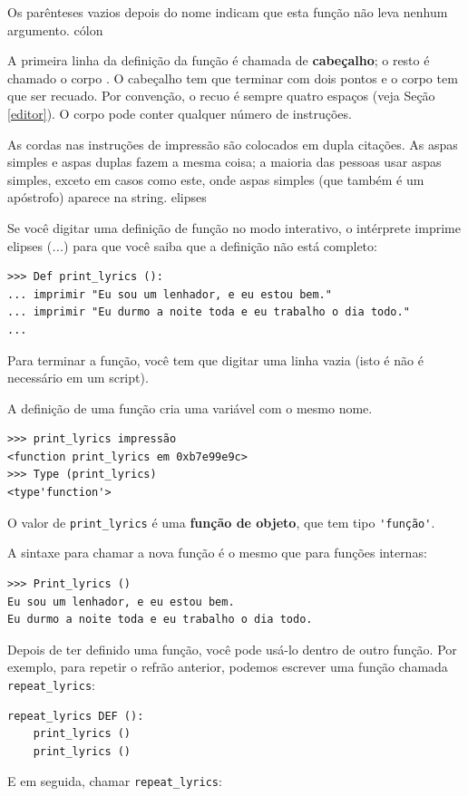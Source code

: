 \documentclass[10pt]{book}
\begin{document}
Os parênteses vazios depois do nome indicam que esta função
não leva nenhum argumento.
\index{} cólon

A primeira linha da definição da função é chamada de {\bf cabeçalho};
o resto é chamado o corpo {\bf}. O cabeçalho tem que terminar com dois pontos
e o corpo tem que ser recuado. Por convenção, o recuo é
sempre quatro espaços (veja Seção ~ \ref {editor}). O corpo pode conter
qualquer número de instruções.

As cordas nas instruções de impressão são colocados em dupla
citações. As aspas simples e aspas duplas fazem a mesma coisa;
a maioria das pessoas usar aspas simples, exceto em casos como este, onde
aspas simples (que também é um apóstrofo) aparece na string.
\index{} elipses

Se você digitar uma definição de função no modo interativo, o intérprete
imprime elipses ({\em ...}) para que você saiba que a definição
não está completo:

\begin{verbatim}
>>> Def print_lyrics ():
... imprimir "Eu sou um lenhador, e eu estou bem."
... imprimir "Eu durmo a noite toda e eu trabalho o dia todo."
...
\end{verbatim}
%
Para terminar a função, você tem que digitar uma linha vazia (isto é
não é necessário em um script).

A definição de uma função cria uma variável com o mesmo nome.

\begin{verbatim}
>>> print_lyrics impressão
<function print_lyrics em 0xb7e99e9c>
>>> Type (print_lyrics)
<type'function'>
\end{verbatim}
%
O valor de \verb "print_lyrics" é uma {\bf função de objeto}, que
tem tipo \verb "'função'".

A sintaxe para chamar a nova função é o mesmo que
para funções internas:

\begin{verbatim}
>>> Print_lyrics ()
Eu sou um lenhador, e eu estou bem.
Eu durmo a noite toda e eu trabalho o dia todo.
\end{verbatim}
%
Depois de ter definido uma função, você pode usá-lo dentro de outro
função. Por exemplo, para repetir o refrão anterior, podemos escrever
uma função chamada \verb "repeat_lyrics":

\begin{verbatim}
repeat_lyrics DEF ():
    print_lyrics ()
    print_lyrics ()
\end{verbatim}
%
E em seguida, chamar \verb "repeat_lyrics":
\end{document}
